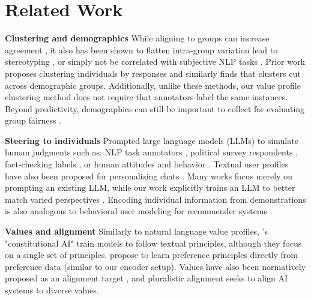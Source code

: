 \documentclass[11pt]{article}
\begin{document}
\section{Related Work} \label{sec:relatedwork}

\textbf{Clustering and demographics} While aligning to groups can increase agreement \citep{chen2024spicaretrievingscenariospluralistic}, it also has been shown to flatten intra-group variation \citep{orlikowski-etal-2023-ecological, Wang2025} lead to stereotyping \citep{cheng-etal-2023-marked}, or simply not be correlated with subjective NLP tasks \citet{orlikowski2025demographicsfinetuninglargelanguage}. Prior work proposes clustering individuals by responses \citep{vitsakis2024voicescrowdsearchingclusters,li-etal-2024-steerability} and similarly finds that clusters cut across demographic groups. Additionally, unlike these methods, our value profile clustering method does not require that annotators label the same instances. Beyond predictivity, demographics can still be important to collect for evaluating group fairness \citep{aguirre2023selectingshotsdemographicfairness, kirk2024prismalignmentdatasetparticipatory}.

\textbf{Steering to individuals} Prompted large language models (LLMs) to simulate human judgments such as: NLP task annotators \citep{Bavaresco:2024}, political survey respondents \citep{argyle_busby_fulda_gubler_rytting_wingate_2023}, fact-checking labels \citep{de2024supernotes}, or human attitudes and behavior \citep{park2024generativeagentsimulations1000}. Textual user profiles have also been proposed for personalizing chats \citep{zhang-etal-2018-personalizing}. Many works focus merely on prompting an existing LLM, while our work explicitly trains an LLM to better match varied perspectives \citep{Gordon_2022, jiang2024languagemodelsreasonindividualistic}. Encoding individual information from demonstrations is also analogous to behavioral user modeling for recommender systems \citep{Radlinski:2022,ramos-etal-2024-transparent}.

\textbf{Values and alignment }
Similarly to natural language value profiles, \citet{bai2022constitutionalaiharmlessnessai}'s "constitutional AI" train models to follow textual principles, although they focus on a single set of principles. \citet{findeis2024inverseconstitutionalaicompressing} propose to learn preference principles directly from preference data (similar to our encoder setup). Values have also been normatively proposed as an alignment target \citep{gabriel2020artificial, klingefjord2024humanvaluesalignai}, and pluralistic alignment \citep{sorensen2024roadmappluralisticalignment} seeks to align AI systems to diverse values.
\end{document}
